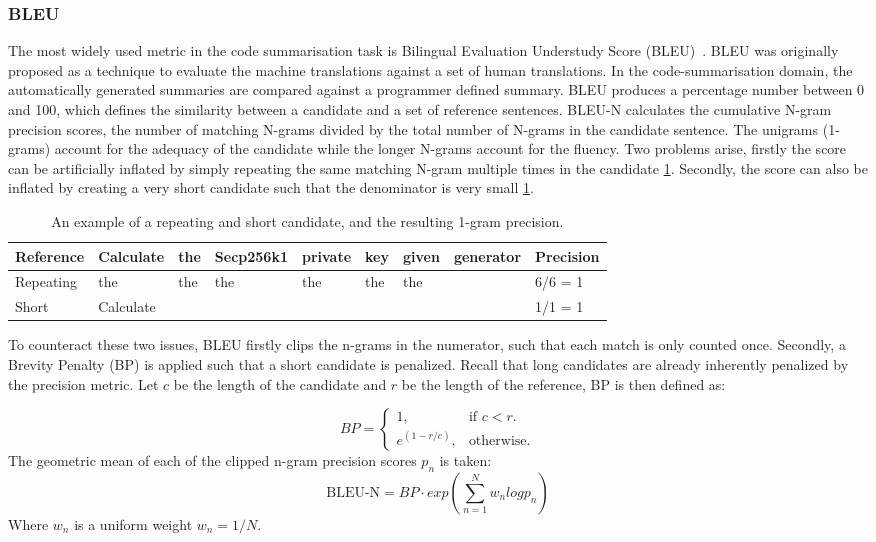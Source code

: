 \subsubsection{BLEU}
The most widely used metric in the code summarisation task is Bilingual Evaluation Understudy Score (BLEU)~\cite{evaluationSummarization}. BLEU was originally proposed as a technique to evaluate the machine translations against a set of human translations. In the code-summarisation domain, the automatically generated summaries are compared against a programmer defined summary. 
BLEU produces a percentage number between 0 and 100, which defines the similarity between a candidate and a set of reference sentences. BLEU-N calculates the cumulative N-gram precision scores, the number of matching N-grams divided by the total number of N-grams in the candidate sentence. The unigrams (1-grams) account for the adequacy of the candidate while the longer N-grams account for the fluency. 
Two problems arise, firstly the score can be artificially inflated by simply repeating the same matching N-gram multiple times in the candidate \ref{tab:BLEUIssues}. Secondly, the score can also be inflated by creating a very short candidate such that the denominator is very small \ref{tab:BLEUIssues}.

\begin{table}[tbh]
\begin{tabular}{l|lllllll|l}
\rowcolor[HTML]{C0C0C0} 
Reference & Calculate & the & Secp256k1 & private & key & given & generator & Precision \\ \hline
Repeating & the       & the & the       & the     & the & the   &           & 6/6 = 1   \\
Short     & Calculate &     &           &         &     &       &           & 1/1 = 1  
\end{tabular}
\caption{An example of a repeating and short candidate, and the resulting 1-gram precision.}
\label{tab:BLEUIssues}
\end{table}

To counteract these two issues, BLEU firstly clips the n-grams in the numerator, such that each match is only counted once. Secondly, a Brevity Penalty (BP) is applied such that a short candidate is penalized. Recall that long candidates are already inherently penalized by the precision metric. Let \(c\) be the length of the candidate and \(r\) be the length of the reference, BP is then defined as:

\begin{equation}
  BP=\begin{cases}
    1, & \text{if $c<r$}.\\
    e^{(1 - r/c)}, & \text{otherwise}.
  \end{cases}
\end{equation}
The geometric mean of each of the clipped n-gram precision scores \(p_n\) is taken:
\[ \text{BLEU-N} = BP \cdot exp(\sum_{n=1}^{N} w_n log p_n ) \]
Where \(w_n\) is a uniform weight \(w_n = 1/N\).

